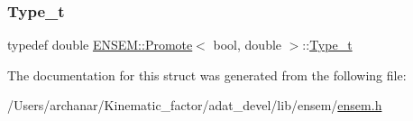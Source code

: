 \subsubsection{\texorpdfstring{Type\_t}{Type\_t}\hspace{0.1cm}{\footnotesize\ttfamily [2/2]}}
{\footnotesize\ttfamily typedef double \mbox{\hyperlink{structENSEM_1_1Promote}{E\+N\+S\+E\+M\+::\+Promote}}$<$ bool, double $>$\+::\mbox{\hyperlink{structENSEM_1_1Promote_3_01bool_00_01double_01_4_ab5d5c27404016e2042b9c4312b087193}{Type\+\_\+t}}}



The documentation for this struct was generated from the following file\+:\begin{DoxyCompactItemize}
\item 
/\+Users/archanar/\+Kinematic\+\_\+factor/adat\+\_\+devel/lib/ensem/\mbox{\hyperlink{lib_2ensem_2ensem_8h}{ensem.\+h}}\end{DoxyCompactItemize}
